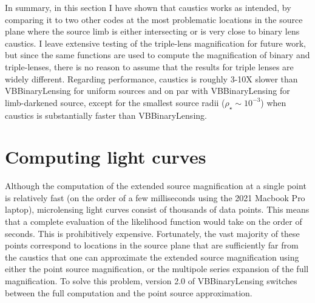 \documentclass[12pt,dvipsnames]{report}
\newcommand{\ssf}[1]{\textsf{#1}}
\begin{document}
In summary, in this section I have shown that \ssf{caustics} works as intended, by comparing 
it to two other codes at the most problematic locations in the source plane where the source 
limb is either intersecting or is very close to binary lens caustics. I leave extensive 
testing of the triple-lens magnification for future work, but since the same functions are used 
to compute the magnification of binary and triple-lenses, there is no reason to assume that 
the results for triple lenses are widely different. Regarding performance, \ssf{caustics} is 
roughly 3-10X slower than \ssf{VBBinaryLensing} for uniform sources and on par with
\ssf{VBBinaryLensing} for limb-darkened source, except for the smallest source radii 
($\rho_\star\sim 10^{-3}$) when \ssf{caustics} is substantially faster than 
\ssf{VBBinaryLensing}. 

\section{Computing light curves}
\label{sec:caustics_light_curves}
Although the computation of the extended source magnification at a single point is relatively
fast (on the order of a few milliseconds using the 2021 Macbook Pro laptop), microlensing light curves 
consist of thousands of data points. This means that a complete evaluation of the likelihood 
function would take on the order of seconds. This is prohibitively expensive. Fortunately, 
the vast majority of these points correspond to locations in the source plane that are 
sufficiently far from the caustics that one can approximate the extended source magnification 
using either the point source magnification, or the multipole series expansion of the 
full magnification. To solve this problem, version 2.0 of \ssf{VBBinaryLensing} 
\citep{2018MNRAS.479.5157B} switches between the full computation 
and the point source approximation.
\end{document}

